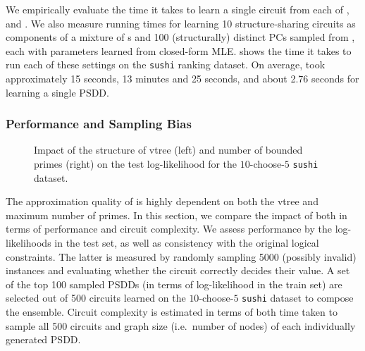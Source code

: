 We empirically evaluate the time it takes to learn a single circuit from each of
,  and . We also measure running times
for learning 10 structure-sharing circuits as components of a mixture of s and
100 (structurally) distinct PCs sampled from , each with parameters learned
from closed-form MLE.  shows the time it takes to run each of these settings
on the \texttt{sushi} ranking dataset. On average,  took approximately \num{15}
seconds,  \num{13} minutes and \num{25} seconds, and 
about \num{2.76} seconds for learning a single PSDD.

\subsubsection{Performance and Sampling Bias}

\begin{figure}[t]
  \begin{subfigure}{0.495\textwidth}
    \caption{}
  \end{subfigure}
  \begin{subfigure}{0.495\textwidth}
    \resizebox{\textwidth}{!}{\texttt{[image: k\_ll]}}
    \caption{}
  \end{subfigure}
  \caption{Impact of the structure of vtree (left) and number of bounded primes (right) on the
    test log-likelihood for the $10$-choose-$5$ \texttt{sushi} dataset.}
  \label{fig:ll-comp}
\end{figure}

The approximation quality of  is highly dependent on both the vtree and
maximum number of primes. In this section, we compare the impact of both in terms of performance
and circuit complexity. We assess performance by the log-likelihoods in the test set, as well as
consistency with the original logical constraints. The latter is measured by randomly sampling
\num{5000} (possibly invalid) instances and evaluating whether the circuit correctly decides their
value. A set of the top \num{100} sampled PSDDs (in terms of log-likelihood in the train set) are
selected out of \num{500} circuits learned on the $10$-choose-$5$ \texttt{sushi} dataset to compose
the ensemble. Circuit complexity is estimated in terms of both time taken to sample all 500
circuits and graph size (i.e.\ number of nodes) of each individually generated PSDD.

